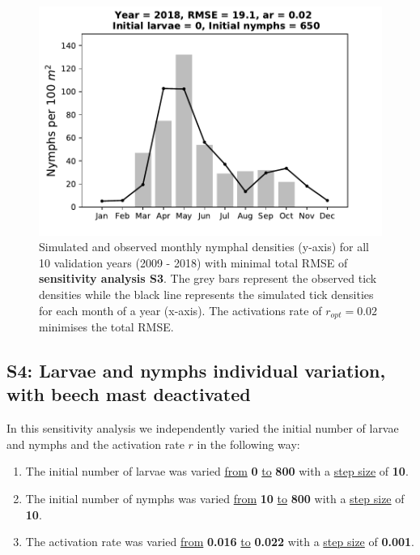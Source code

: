 \documentclass[a4paper, 11pt]{scrartcl}
\begin{document}
\begin{figure}[h!]
\begin{minipage}[c]{0.40\linewidth}
\end{minipage}
\begin{minipage}[c]{0.40\linewidth}
\includegraphics[width=\linewidth]{figures/s3/s3_2018}
\end{minipage}
\caption{Simulated and observed monthly nymphal densities (y-axis) for all 10 validation years (2009 - 2018) with minimal total RMSE of \textbf{sensitivity analysis S3}. The grey
bars represent the observed tick densities while the black line represents the simulated tick densities for each month of a year (x-axis). The activations rate of
$r_{opt}= 0.02$ minimises the total RMSE.}
\label{fig:independent_initial_ticks_with_beech}
\end{figure}


\newpage
\subsection{S4: Larvae and nymphs individual variation, with beech mast deactivated}
In this sensitivity analysis we independently varied the initial number of larvae and nymphs and the activation rate $r$ in the following way:

\begin{enumerate}
\item The initial number of larvae was varied \underline{from} \textbf{0} \underline{to} \textbf{800} with a \underline{step size} of \textbf{10}.
\item The initial number of nymphs was varied \underline{from} \textbf{10} \underline{to} \textbf{800} with a \underline{step size} of \textbf{10}.
\item The activation rate was varied \underline{from} \textbf{0.016} \underline{to} \textbf{0.022} with a \underline{step size} of \textbf{0.001}.
\end{enumerate}
\end{document}
